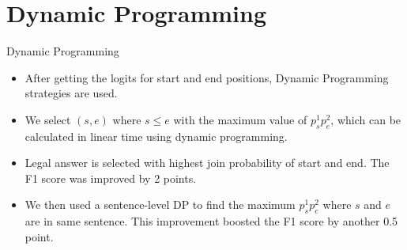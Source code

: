 \documentclass[10pt]{beamer}
\begin{document}
\section{Dynamic Programming}
\begin{frame}{Dynamic Programming}
	\begin{itemize}
		\item After getting the logits for start and end positions, Dynamic Programming strategies are used.
		\item We select $(s, e)$ where $s \leq e$ with the maximum value of $p_s^1p_e^2$, which can be calculated in linear time using dynamic programming.
		\item Legal answer is selected with highest join probability of start and end. The F1 score was improved by 2 points.
		\item We then used a sentence-level DP to find the maximum $p_s^1p_e^2$ where $s$ and $e$ are in same sentence. This improvement boosted the F1 score by another 0.5 point.
	\end{itemize}
\end{frame}
\end{document}
